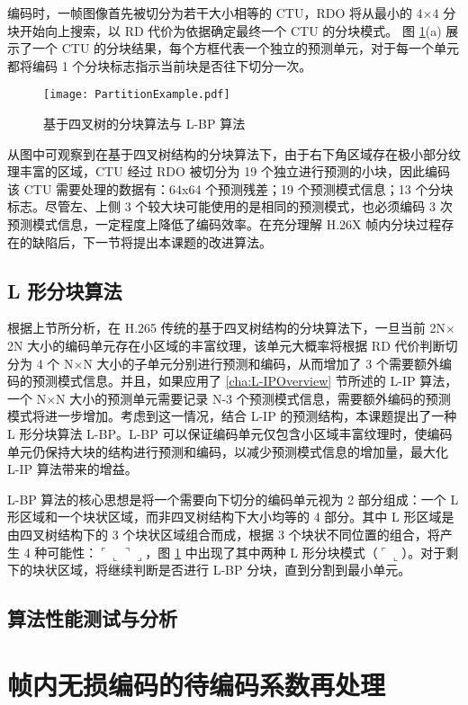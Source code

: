 编码时，一帧图像首先被切分为若干大小相等的 CTU，RDO 将从最小的 4$\times$4 分块开始向上搜索，以 RD 代价为依据确定最终一个 CTU 的分块模式。
图 \ref{fig:PartitionExample}(a) 展示了一个 CTU 的分块结果，每个方框代表一个独立的预测单元，对于每一个单元都将编码 1 个分块标志指示当前块是否往下切分一次。
\begin{figure}[hbt]
    \centering
    \texttt{[image: PartitionExample.pdf]}
    \caption{基于四叉树的分块算法与 L-BP 算法}
    \label{fig:PartitionExample}
\end{figure}
从图中可观察到在基于四叉树结构的分块算法下，由于右下角区域存在极小部分纹理丰富的区域，CTU 经过 RDO 被切分为 19 个独立进行预测的小块，因此编码该 CTU 需要处理的数据有：64x64 个预测残差；19 个预测模式信息；13 个分块标志。尽管左、上侧 3 个较大块可能使用的是相同的预测模式，也必须编码 3 次预测模式信息，一定程度上降低了编码效率。在充分理解 H.26X 帧内分块过程存在的缺陷后，下一节将提出本课题的改进算法。

\subsection{L 形分块算法}
根据上节所分析，在 H.265 传统的基于四叉树结构的分块算法下，一旦当前 2N$\times$2N 大小的编码单元存在小区域的丰富纹理，该单元大概率将根据 RD 代价判断切分为 4 个 N$\times$N 大小的子单元分别进行预测和编码，从而增加了 3 个需要额外编码的预测模式信息。并且，如果应用了 \ref{cha:L-IPOverview} 节所述的 L-IP 算法，一个 N$\times$N 大小的预测单元需要记录 N-3 个预测模式信息，需要额外编码的预测模式将进一步增加。考虑到这一情况，结合 L-IP 的预测结构，本课题提出了一种 L 形分块算法 L-BP。L-BP 可以保证编码单元仅包含小区域丰富纹理时，使编码单元仍保持大块的结构进行预测和编码，以减少预测模式信息的增加量，最大化 L-IP 算法带来的增益。

L-BP 算法的核心思想是将一个需要向下切分的编码单元视为 2 部分组成：一个 L 形区域和一个块状区域，而非四叉树结构下大小均等的 4 部分。其中 L 形区域是由四叉树结构下的 3 个块状区域组合而成，根据 3 个块状不同位置的组合，将产生 4 种可能性：$\ulcorner \llcorner \urcorner \lrcorner$，图 \ref{fig:PartitionExample} 中出现了其中两种 L 形分块模式（$\ulcorner \llcorner$）。对于剩下的块状区域，将继续判断是否进行 L-BP 分块，直到分割到最小单元。

\subsection{算法性能测试与分析}


\section{帧内无损编码的待编码系数再处理}

